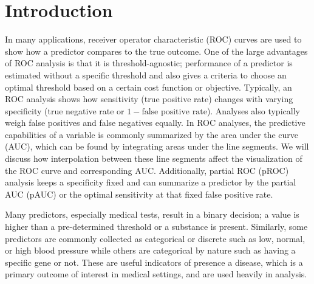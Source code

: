 \documentclass[12pt]{article}
\begin{document}
\hypertarget{introduction}{%
\section{Introduction}\label{introduction}}

In many applications, receiver operator characteristic (ROC) curves are
used to show how a predictor compares to the true outcome. One of the
large advantages of ROC analysis is that it is threshold-agnostic;
performance of a predictor is estimated without a specific threshold and
also gives a criteria to choose an optimal threshold based on a certain
cost function or objective. Typically, an ROC analysis shows how
sensitivity (true positive rate) changes with varying specificity (true
negative rate or \(1 - \text{false positive rate}\)). Analyses also
typically weigh false positives and false negatives equally. In ROC
analyses, the predictive capabilities of a variable is commonly
summarized by the area under the curve (AUC), which can be found by
integrating areas under the line segments. We will discuss how
interpolation between these line segments affect the visualization of
the ROC curve and corresponding AUC. Additionally, partial ROC (pROC)
analysis keeps a specificity fixed and can summarize a predictor by the
partial AUC (pAUC) or the optimal sensitivity at that fixed false
positive rate.

Many predictors, especially medical tests, result in a binary decision;
a value is higher than a pre-determined threshold or a substance is
present. Similarly, some predictors are commonly collected as
categorical or discrete such as low, normal, or high blood pressure
while others are categorical by nature such as having a specific gene or
not. These are useful indicators of presence a disease, which is a
primary outcome of interest in medical settings, and are used heavily in
analysis.
\end{document}
